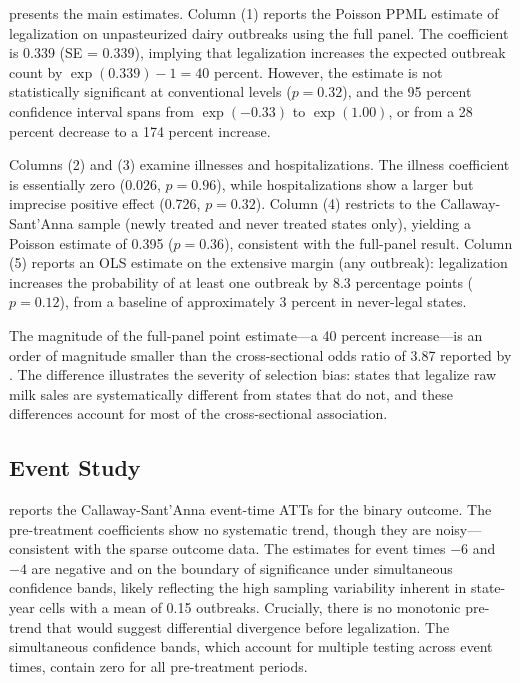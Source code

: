 \documentclass[12pt]{article}
\begin{document}
 presents the main estimates. Column (1) reports the Poisson PPML estimate of legalization on unpasteurized dairy outbreaks using the full panel. The coefficient is 0.339 (SE = 0.339), implying that legalization increases the expected outbreak count by $\exp(0.339) - 1 = 40$ percent. However, the estimate is not statistically significant at conventional levels ($p = 0.32$), and the 95 percent confidence interval spans from $\exp(-0.33)$ to $\exp(1.00)$, or from a 28 percent decrease to a 174 percent increase.

Columns (2) and (3) examine illnesses and hospitalizations. The illness coefficient is essentially zero (0.026, $p = 0.96$), while hospitalizations show a larger but imprecise positive effect (0.726, $p = 0.32$). Column (4) restricts to the Callaway-Sant'Anna sample (newly treated and never treated states only), yielding a Poisson estimate of 0.395 ($p = 0.36$), consistent with the full-panel result. Column (5) reports an OLS estimate on the extensive margin (any outbreak): legalization increases the probability of at least one outbreak by 8.3 percentage points ($p = 0.12$), from a baseline of approximately 3 percent in never-legal states.

The magnitude of the full-panel point estimate---a 40 percent increase---is an order of magnitude smaller than the cross-sectional odds ratio of 3.87 reported by \citet{Whitten2022}. The difference illustrates the severity of selection bias: states that legalize raw milk sales are systematically different from states that do not, and these differences account for most of the cross-sectional association.



\subsection{Event Study}

 reports the Callaway-Sant'Anna event-time ATTs for the binary outcome. The pre-treatment coefficients show no systematic trend, though they are noisy---consistent with the sparse outcome data. The estimates for event times $-6$ and $-4$ are negative and on the boundary of significance under simultaneous confidence bands, likely reflecting the high sampling variability inherent in state-year cells with a mean of 0.15 outbreaks. Crucially, there is no monotonic pre-trend that would suggest differential divergence before legalization. The simultaneous confidence bands, which account for multiple testing across event times, contain zero for all pre-treatment periods.
\end{document}
